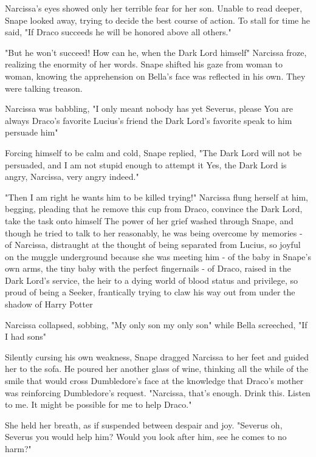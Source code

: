 Narcissa's eyes showed only her terrible fear for her son. Unable to read deeper, Snape looked away, trying to decide the best course of action. To stall for time he said, "If Draco succeeds he will be honored above all others."

"But he won't succeed! How can he, when the Dark Lord himself{\el}" Narcissa froze, realizing the enormity of her words. Snape shifted his gaze from woman to woman, knowing the apprehension on Bella's face was reflected in his own. They were talking treason.

Narcissa was babbling, "I only meant{\el} nobody has yet{\el} Severus, please{\el} You are{\el} always{\el} Draco's favorite{\el} Lucius's friend{\el} the Dark Lord's favorite{\el} speak to him{\el} persuade him{\el}"

Forcing himself to be calm and cold, Snape replied, "The Dark Lord will not be persuaded, and I am not stupid enough to attempt it{\el} Yes, the Dark Lord is angry, Narcissa, very angry indeed."

"Then I am right{\el} he wants him to be killed trying!" Narcissa flung herself at him, begging, pleading that he remove this cup from Draco, convince the Dark Lord, take the task onto himself{\el} The power of her grief washed through Snape, and though he tried to talk to her reasonably, he was being overcome by memories - of Narcissa, distraught at the thought of being separated from Lucius, so joyful on the muggle underground because she was meeting him - of the baby in Snape's own arms, the tiny baby with the perfect fingernails - of Draco, raised in the Dark Lord's service, the heir to a dying world of blood status and privilege, so proud of being a Seeker, frantically trying to claw his way out from under the shadow of Harry Potter{\el}

Narcissa collapsed, sobbing, "My only son{\el} my only son{\el}" while Bella screeched, "If I had sons{\el}"

Silently cursing his own weakness, Snape dragged Narcissa to her feet and guided her to the sofa. He poured her another glass of wine, thinking all the while of the smile that would cross Dumbledore's face at the knowledge that Draco's mother was reinforcing Dumbledore's request. "Narcissa, that's enough. Drink this. Listen to me. It might be possible{\el} for me to help Draco."

She held her breath, as if suspended between despair and joy. "Severus{\el} oh, Severus{\el} you would help him? Would you look after him, see he comes to no harm?"

